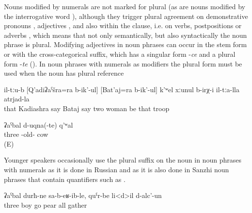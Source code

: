 Nouns modified by numerals are not marked for plural (as are nouns modified by the interrogative word  ), although they trigger plural agreement on demonstrative pronouns , adjectives , and also within the clause, i.e. on verbs, postpositions or adverbs , which means that not only semantically, but also syntactically the noun phrase is plural. Modifying adjectives in noun phrases can occur in the stem form or with the cross-categorical suffix, which has a singular form -\textit{ce} and a plural form -\textit{te} (). In noun phrases with numerals as modifiers the plural form must be used when the noun has plural reference 
%
\begin{exe}
	\ex	\label{ex:There were two women of their troops called Kadiashra and Bataj@5}
	\gll	il-tːu-b	[Q'adiʡaˁšra=ra	b-ik'-ul]	[Bat'aj=ra	b-ik'-ul]		k'ʷel	xːunul	b-irχ-i	il-tːa-lla	atrjad-la\\
		that	Kadiashra	say	Bataj	say		two	woman	be	that	troop\\
	\glt	{}
	
	\ex	\label{three old cowsNP}
	\gll ʡaˁbal	d-uqna(-te)	q'ʷal\\
	three	-old- 	cow\\
	\glt	{} (E)
\end{exe}


Younger speakers occasionally use the plural suffix on the noun in noun phrases with numerals as it is done in Russian  and as it is also done in Sanzhi noun phrases that contain quantifiers such as   .
%
\begin{exe}
	\ex	\label{ex:Three boys came and gathered all the pears@6}
	\gll	ʡaˁbal	durħ-ne	sa-b-eʁ-ib-le,	quˁr-be	li<d>il		d-alc'-un\\
		three	boy	go	pear	all	gather\\
	\glt	{}
\end{exe}



